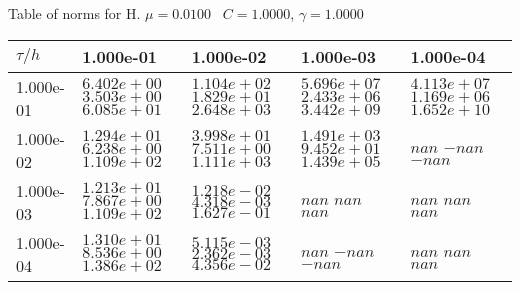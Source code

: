 \begin{center}
Table of norms for H. $\mu = 0.0100$ \, $C = 1.0000$, $\gamma = 1.0000$
  
\begin{tabular}{|p{1in}|p{1in}|p{1in}|p{1in}|p{1in}|} \hline
$\tau / h$ &1.000e-01 &1.000e-02 &1.000e-03 &1.000e-04 \\ \hline 
1.000e-01 & $6.402e+00$  $3.503e+00$  $6.085e+01$  & $1.104e+02$  $1.829e+01$  $2.648e+03$  & $5.696e+07$  $2.433e+06$  $3.442e+09$  & $4.113e+07$  $1.169e+06$  $1.652e+10$  \\ \hline 
1.000e-02 & $1.294e+01$  $6.238e+00$  $1.109e+02$  & $3.998e+01$  $7.511e+00$  $1.111e+03$  & $1.491e+03$  $9.452e+01$  $1.439e+05$  & $nan$  $-nan$  $-nan$  \\ \hline 
1.000e-03 & $1.213e+01$  $7.867e+00$  $1.109e+02$  & $1.218e-02$  $4.318e-03$  $1.627e-01$  & $nan$  $nan$  $nan$  & $nan$  $nan$  $nan$  \\ \hline 
1.000e-04 & $1.310e+01$  $8.536e+00$  $1.386e+02$  & $5.115e-03$  $2.362e-03$  $4.356e-02$  & $nan$  $-nan$  $-nan$  & $nan$  $nan$  $nan$  \\ \hline 

\end{tabular}\\[20pt]
\end{center}
